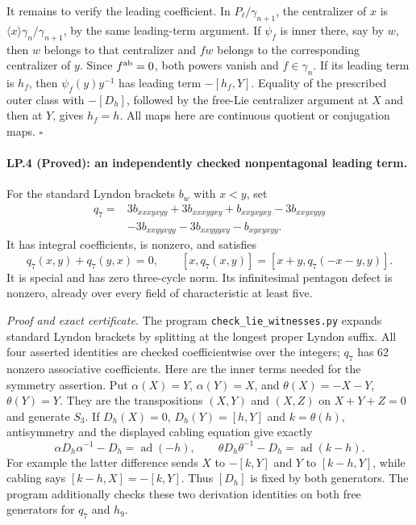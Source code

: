 It remains to verify the leading coefficient. In
$P_\ell/\gamma_{n+1}$, the centralizer of $x$ is
$\langle x\rangle\gamma_n/\gamma_{n+1}$, by the same leading-term
argument. If $\psi_f$ is inner there, say by $w$, then $w$ belongs
to that centralizer and $fw$ belongs to the corresponding centralizer
of $y$. Since $f^{\rm ab}=0$, both powers vanish and
$f\in\gamma_n$. If its leading term is $h_f$, then
$\psi_f(y)y^{-1}$ has leading term $-[h_f,Y]$.
Equality of the prescribed outer class with $-[D_h]$, followed by
the free-Lie centralizer argument at $X$ and then at $Y$, gives
$h_f=h$. All maps here are continuous quotient or conjugation maps.
\hfill$\square$

\paragraph{LP.4 (Proved): an independently checked nonpentagonal leading term.}
For the standard Lyndon brackets $b_w$ with $x<y$, set
\[
\begin{split}
q_7={}&3b_{xxxyxyy}+3b_{xxxyyxy}+b_{xxyxyxy}
       -3b_{xxyxyyy}\\
     &-3b_{xxyyxyy}-3b_{xxyyyxy}-b_{xyxyxyy}.
\end{split}
\]
It has integral coefficients, is nonzero, and satisfies
\[
 q_7(x,y)+q_7(y,x)=0,\qquad
 [x,q_7(x,y)]=[x+y,q_7(-x-y,y)].
\]
It is special and has zero three-cycle norm. Its infinitesimal
pentagon defect is nonzero, already over every field of
characteristic at least five.

\emph{Proof and exact certificate.}
The program \texttt{check\_lie\_witnesses.py} expands standard
Lyndon brackets by splitting at the longest proper Lyndon suffix.
All four asserted identities are checked coefficientwise over the
integers; $q_7$ has 62 nonzero associative coefficients. Here are the
inner terms needed for the symmetry assertion. Put
$\alpha(X)=Y$, $\alpha(Y)=X$, and
$\theta(X)=-X-Y$, $\theta(Y)=Y$. They are the transpositions
$(X,Y)$ and $(X,Z)$ on $X+Y+Z=0$ and generate $S_3$. If
$D_h(X)=0$, $D_h(Y)=[h,Y]$ and $k=\theta(h)$, antisymmetry and
the displayed cabling equation give exactly
\[
 \alpha D_h\alpha^{-1}-D_h=\operatorname{ad}(-h),\qquad
 \theta D_h\theta^{-1}-D_h=\operatorname{ad}(k-h).
\]
For example the latter difference sends $X$ to $-[k,Y]$ and
$Y$ to $[k-h,Y]$, while cabling says
$[k-h,X]=-[k,Y]$. Thus $[D_h]$ is fixed by both generators.
The program additionally checks these two derivation identities on
both free generators for $q_7$ and $h_9$.

